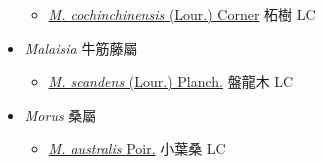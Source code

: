\begin{itemize}
  \begin{itemize}
        \item[] \href{http://www.theplantlist.org/tpl1.1/search?q=Maclura+cochinchinensis}{\textit{M. cochinchinensis} (Lour.) Corner}   柘樹 LC
  \end{itemize}
 \item[] \textit{Malaisia} 牛筋藤屬
                    
  \begin{itemize}
        \item[] \href{http://www.theplantlist.org/tpl1.1/search?q=Malaisia+scandens}{\textit{M. scandens} (Lour.) Planch.}   盤龍木 LC
  \end{itemize}
 \item[] \textit{Morus} 桑屬
                    
  \begin{itemize}
        \item[] \href{http://www.theplantlist.org/tpl1.1/search?q=Morus+australis}{\textit{M. australis} Poir.}   小葉桑 LC
  \end{itemize}
  \end{itemize}
